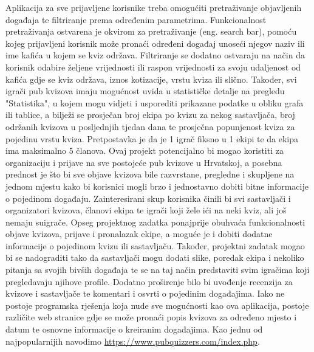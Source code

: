 		\newline \newline
		Aplikacija za sve prijavljene korisnike  treba omogućiti pretraživanje objavljenih događaja te filtriranje prema određenim parametrima. Funkcionalnost pretraživanja ostvarena je okvirom za pretraživanje (eng. search bar), pomoću kojeg prijavljeni korisnik može pronaći određeni događaj unoseći njegov naziv ili ime kafića u kojem se kviz održava. Filtriranje se dodatno ostvaraju na način da korisnik odabire željene vrijednosti ili raspon vrijednosti za svoju udaljenost od kafića gdje se kviz održava, iznos kotizacije, vrstu kviza ili slično.
		\newline \newline
		Također, svi igrači pub kvizova imaju mogućnost uvida u statističke detalje na pregledu "Statistika", u kojem mogu vidjeti i usporediti  prikazane podatke u obliku grafa ili tablice, a bilježi se prosječan broj ekipa po kvizu za nekog sastavljača, broj održanih kvizova u posljednjih tjedan dana te prosječna popunjenost kviza za pojedinu vrstu kviza.
		\newline \newline
		Pretpostavka je da je 1 igrač fiksno u 1 ekipi te da ekipa ima maksimalno 5 članova.
		\newline \newline
		Ovaj projekt potencijalno bi mogao koristiti za organizaciju i prijave na sve postojeće pub kvizove u Hrvatskoj, a posebna prednost je što bi sve objave kvizova bile razvrstane, pregledne i skupljene na jednom mjestu kako bi korisnici mogli brzo i jednostavno dobiti bitne informacije o pojedinom događaju. 
		Zainteresirani skup korisnika činili bi svi sastavljači i organizatori kvizova, članovi ekipa te igrači koji žele ići na neki kviz, ali još nemaju suigrače. 
		Opseg projektnog zadatka ponajprije obuhvaća funkcionalnosti objave kvizova, prijave i pronalazak ekipe, a moguće je i dobiti dodatne informacije o pojedinom kvizu ili sastavljaču. 
		Također, projektni zadatak mogao bi se nadograditi tako da sastavljači mogu dodati slike, poredak ekipa i nekoliko pitanja sa svojih bivših događaja te se na taj način predstaviti svim igračima koji pregledavaju njihove profile. Dodatno proširenje bilo bi uvođenje recenzija za kvizove i sastavljače te komentari i osvrti o pojedinim događajima.
		Iako ne postoje programska rješenja koja nude sve mogućnosti kao ova aplikacija, postoje različite web stranice gdje se može pronaći popis kvizova za određeno mjesto i datum te osnovne informacije o kreiranim događajima. Kao jednu od najpopularnijih navodimo \url{https://www.pubquizzers.com/index.php}.
		
